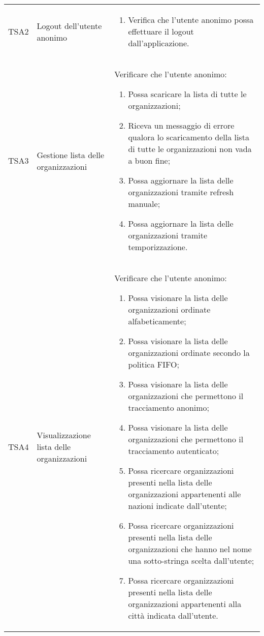 {\begin{longtable}{ c  C{3cm}  C{11cm} }
TSA2  & Logout dell'utente anonimo & \begin{enumerate}
    \item Verifica che l'utente anonimo possa effettuare il logout dall'applicazione.
\end{enumerate} \\

TSA3 & Gestione lista delle organizzazioni &
Verificare che l'utente anonimo:
\begin{enumerate}
    \item Possa scaricare la lista di tutte le organizzazioni;
    \item Riceva un messaggio di errore qualora lo scaricamento della lista di tutte le organizzazioni non vada a buon fine;
    \item Possa aggiornare la lista delle organizzazioni tramite refresh manuale;
    \item Possa aggiornare la lista delle organizzazioni tramite temporizzazione.
\end{enumerate} \\

TSA4 & Visualizzazione lista delle organizzazioni & 
Verificare che l'utente anonimo:
\begin{enumerate}
    \item Possa visionare la lista delle organizzazioni ordinate alfabeticamente;
    \item Possa visionare la lista delle organizzazioni ordinate secondo la politica FIFO;
    \item Possa visionare la lista delle organizzazioni che permettono il tracciamento anonimo;
    \item Possa visionare la lista delle organizzazioni che permettono il tracciamento autenticato;
    \item Possa ricercare organizzazioni presenti nella lista delle organizzazioni appartenenti alle nazioni indicate dall'utente;
    \item Possa ricercare organizzazioni presenti nella lista delle organizzazioni che hanno nel nome una sotto-stringa scelta dall'utente;
    \item Possa ricercare organizzazioni presenti nella lista delle organizzazioni appartenenti alla città indicata dall'utente.
\end{enumerate} \\


\end{longtable}}
